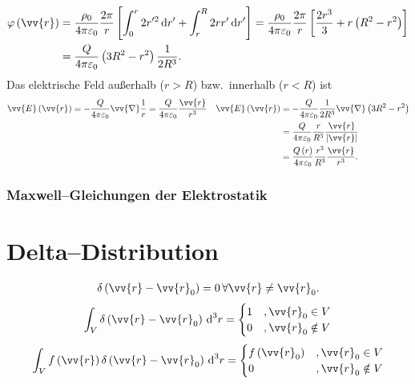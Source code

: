\documentclass[a4paper,12pt]{article}
\newcommand{\td}{\,\text{d}}
\numberwithin{equation}{section}
\begin{document}
\begin{align} 
        \varphi \left(\vv{r}\right)&=\dfrac{\rho _0}{4\pi \varepsilon _0}\dfrac{2\pi }{r}\left[\int_{0}^{r}2r'^2\td r'+\int_{r}^{R}2rr'\td r'\right]=\dfrac{\rho _0}{4\pi \varepsilon _0}\dfrac{2\pi }{r}\left[\dfrac{2r^3}{3}+r\left(R^2-r^2\right)\right]\\
                                   &=\dfrac{Q}{4\pi \varepsilon _0}\left(3R^2-r^2\right)\dfrac{1}{2R^3}
.\end{align} 
Das elektrische Feld außerhalb ($r>R$) bzw.\ innerhalb ($r<R$) ist
\begin{align} 
        \vv{E}\left(\vv{r}\right)&=-\dfrac{Q}{4\pi \varepsilon _0}\vv{\nabla }\dfrac{1}{r}=\dfrac{Q}{4\pi \varepsilon _0}\dfrac{\vv{r}}{r^3}& \vv{E}\left(\vv{r}\right)&=-\dfrac{Q}{4\pi \varepsilon _0}\dfrac{1}{2R^3}\vv{\nabla }\left(3R^2-r^2\right)\\
                                 &&&=\dfrac{Q}{4\pi \varepsilon _0}\dfrac{r}{R^3}\dfrac{\vv{r}}{|\vv{r}|}\nonumber \\
                                 &&&=\dfrac{Q\left(r\right)}{4\pi \varepsilon _0}\dfrac{r^3}{R^3}\dfrac{\vv{r}}{r^3}
.\end{align} 

\subsubsection{Maxwell--Gleichungen der Elektrostatik}


\newpage
\section{Delta--Distribution}
\begin{align} 
        \delta \left(\vv{r}-\vv{r}_0\right)=0\,\forall \vv{r}\neq \vv{r}_0
.\end{align} 
\begin{align} 
        \int_{V}^{}\delta \left(\vv{r}-\vv{r}_0\right)\td ^3r=\begin{cases}
                1&,\vv{r}_0 \in V\\
                0&,\vv{r}_0 \notin V
        \end{cases}
\end{align} 
\begin{align} 
        \int_{V}^{}f\left(\vv{r}\right)\delta \left(\vv{r}-\vv{r}_0\right)\td ^3r=\begin{cases}
                f\left(\vv{r}_0\right)&,\vv{r}_0 \in V\\
                0&,\vv{r}_0 \notin V
        \end{cases}
\end{align} 
\end{document}
